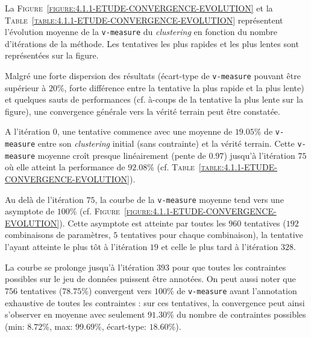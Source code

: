 			La \textsc{Figure~\ref{figure:4.1.1-ETUDE-CONVERGENCE-EVOLUTION}} et la \textsc{Table~\ref{table:4.1.1-ETUDE-CONVERGENCE-EVOLUTION}} représentent l'évolution moyenne de la \texttt{v-measure} du \textit{clustering} en fonction du nombre d'itérations de la méthode. Les tentatives les plus rapides et les plus lentes sont représentées sur la figure.
							
			Malgré une forte dispersion des résultats (écart-type de \texttt{v-measure} pouvant être supérieur à $20$\%, forte différence entre la tentative la plus rapide et la plus lente) et quelques sauts de performances (cf. à-coups de la tentative la plus lente sur la figure), une convergence générale vers la vérité terrain peut être constatée.
			
			A l'itération $0$, une tentative commence avec une moyenne de $19.05$\% de \texttt{v-measure}  entre son \textit{clustering} initial (sans contrainte) et la vérité terrain.
			Cette \texttt{v-measure} moyenne croît presque linéairement (pente de $0.97$) jusqu'à l'itération $75$ où elle atteint la performance de $92.08$\% (cf. \textsc{Table~\ref{table:4.1.1-ETUDE-CONVERGENCE-EVOLUTION}}).

			Au delà de l'itération $75$, la courbe de la \texttt{v-measure} moyenne tend vers une asymptote de $100$\% (cf. \textsc{Figure~\ref{figure:4.1.1-ETUDE-CONVERGENCE-EVOLUTION}}).
			Cette asymptote est atteinte par toutes les $960$ tentatives ($192$ combinaisons de paramètres, $5$ tentatives pour chaque combinaison), la tentative l'ayant atteinte le plus tôt à l'itération $19$ et celle le plus tard à l'itération $328$.
			
			La courbe se prolonge jusqu'à l'itération $393$ pour que toutes les contraintes possibles sur le jeu de données puissent être annotées.
			On peut aussi noter que $756$ tentatives ($78.75$\%) convergent vers $100$\% de \texttt{v-measure} avant l'annotation exhaustive de toutes les contraintes : sur ces tentatives, la convergence peut ainsi s'observer en moyenne avec seulement $91.30$\% du nombre de contraintes possibles (min: $8.72$\%, max: $99.69$\%, écart-type: $18.60$\%).
			
